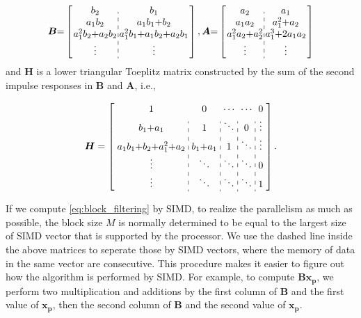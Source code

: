 \begin{equation*}
    \begin{aligned}
          \bm{B} {=} \left[\arraycolsep=1.0pt\def\arraystretch{1.0}
            \begin{array}{c:c}
        b_2 & b_1 \\ 
        a_1b_2 & a_1b_1{+}b_2 \\
        a_1^2b_2{+}a_2b_2 & a_1^2b_1{+}a_1b_2{+}a_2b_1 \\
        \vdots & \vdots \\
        \end{array}\right], 
        \bm{A} {=} \left[\arraycolsep=1.0pt\def\arraystretch{1.0}
            \begin{array}{c:c} 
            a_2 & a_1 \\ 
            a_1a_2 & a_1^2{+}a_2 \\
            a_1^2a_2{+}a_2^2 & a_1^3{+}2a_1a_2 \\
            \vdots & \vdots \\
            \end{array}\right]
        \end{aligned}
\end{equation*}
and $\bm{H}$ is a lower triangular Toeplitz matrix constructed by the sum of the second impulse responses in $\bm{B}$ and $\bm{A}$, 
i.e.,

\begin{equation*}
        \bm{H} = \left[\arraycolsep=3.0pt\def\arraystretch{1.2}
            \begin{array}{c:c:c:c:c}
            1 & 0 & \cdots & \cdots & 0 \\ 
            b_1{+}a_1 & 1 & \ddots & 0  & \vdots \\
            a_1b_1{+}b_2{+}a_1^2{+}a_2 & b_1{+}a_1 & 1 & \ddots & \vdots \\
            \vdots & \ddots & \ddots & \ddots & 0 \\
            \vdots & \ddots & \ddots & \ddots & 1 \\
            \end{array}\right].  \\
\end{equation*}

If we compute \eqref{eq:block_filtering} by SIMD, 
to realize the parallelism as much as possible,
the block size $M$ is normally 
determined to be equal to the largest size of SIMD vector that is supported by the processor.
We use the dashed line inside the above matrices to seperate those by SIMD vectors, 
where the memory of data in the same vector are consecutive.
This procedure makes it easier to figure out how the algorithm is performed by SIMD.
For example, to compute $\bm{B}\bm{x_p}$, we perform two multiplication and additions by the first column of $\bm{B}$ and the first value of $\bm{x_p}$,
then the second column of $\bm{B}$ and the second value of $\bm{x_p}$.

